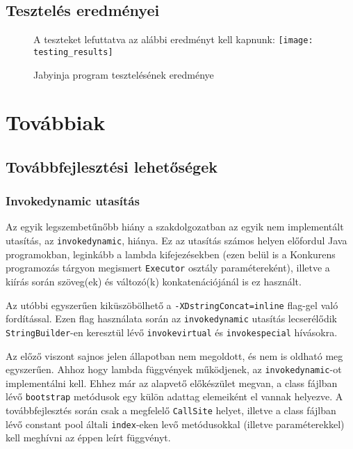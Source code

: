 \subsection{Tesztelés eredményei}

\begin{figure}[H]
	A teszteket lefuttatva az alábbi eredményt kell kapnunk:
	\centering
	\texttt{[image: testing\_results]}
	\caption{Jabyinja program tesztelésének eredménye}
	\label{fig:testing}
\end{figure}

\section{Továbbiak}

\subsection{Továbbfejlesztési lehetőségek}

\subsubsection{Invokedynamic utasítás}

Az egyik legszembetűnőbb hiány a szakdolgozatban az egyik nem implementált utasítás, az \lstinline{invokedynamic}, hiánya.
Ez az utasítás számos helyen előfordul Java programokban, leginkább a lambda kifejezésekben (ezen belül is a Konkurens programozás tárgyon megismert \lstinline{Executor} osztály paramétereként), illetve a kiírás során szöveg(ek) és változó(k) konkatenációjánál is ez használt.

Az utóbbi egyszerűen kiküszöbölhető a \lstinline{-XDstringConcat=inline} flag-gel való fordítással. Ezen flag használata során az \lstinline{invokedynamic} utasítás lecserélődik \lstinline{StringBuilder}-en keresztül lévő \lstinline{invokevirtual} és \lstinline{invokespecial} hívásokra.

Az előző viszont sajnos jelen állapotban nem megoldott, és nem is oldható meg egyszerűen. Ahhoz hogy lambda függvények működjenek, az \lstinline{invokedynamic}-ot implementálni kell. Ehhez már az alapvető előkészület megvan, a class fájlban lévő \lstinline{bootstrap} metódusok egy külön adattag elemeiként el vannak helyezve. A továbbfejlesztés során csak a megfelelő \lstinline{CallSite} helyet, illetve a class fájlban lévő constant pool általi \lstinline{index}-eken levő metódusokkal (illetve paraméterekkel) kell meghívni az éppen leírt függvényt.

